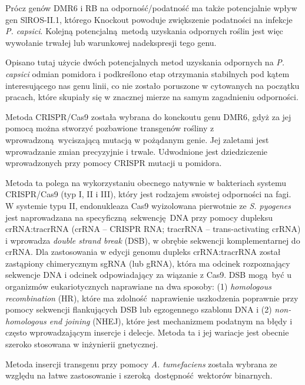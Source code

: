 \documentclass[two column, twoside, a4paper]{article}
\begin{document}
Prócz genów DMR6 i RB na odporność/podatność ma także potencjalnie wpływ gen SlROS-II.1, którego Knockout powoduje zwiększenie podatności na infekcje \textit{P. capsici}\autocite{Yang2020}. Kolejną potencjalną metodą uzyskania odpornych roślin jest więc wywołanie trwałej lub warunkowej nadekspresji tego genu.

Opisano tutaj użycie dwóch potencjalnych metod uzyskania odpornych na \textit{P. capsici} odmian pomidora i podkreślono etap otrzymania stabilnych pod kątem interesującego nas genu linii, co nie zostało poruszone w cytowanych na początku pracach, które skupiały się w znacznej mierze na samym zagadnieniu odporności.

Metoda CRISPR/Cas9 została wybrana do konckoutu genu DMR6, gdyż za jej pomocą można stworzyć pozbawione transgenów rośliny z wprowadzoną wyciszającą mutacją w pożądanym genie. Jej zaletami jest wprowadzanie zmian precyzyjnie i trwale. Udwodnione jest dziedziczenie wprowadzonych przy pomocy CRISPR mutacji u pomidora\autocite{Pan2016}.

Metoda ta polega na wykorzystaniu obecnego natywnie w bakteriach systemu CRISPR/Cas9 (typ I, II i III), który jest rodzajem swoistej odporności na fagi\autocite{Mojica2000, Makarova2011}. W systemie typu II, endonukleaza Cas9 wyizolowana pierwotnie ze \textit{S. pyogenes} jest naprowadzana na specyficzną sekwencję DNA przy pomocy dupleksu crRNA:tracrRNA (crRNA -- CRISPR RNA; tracrRNA -- trans-activating crRNA) i wprowadza \textit{double strand break} (DSB), w obrębie sekwencji komplementarnej do crRNA\autocite{Gaj2013, Jiang2017}. Dla zastosowania w edycji genomu dupleks crRNA:tracrRNA został zastąpiony chimerycznym sgRNA (lub gRNA), która ma odcinek rozpoznający sekwencje DNA i odcinek odpowiadający za wiązanie z Cas9. DSB mogą być u organizmów eukariotycznych naprawiane na dwa sposoby: (1) \textit{homologous recombination} (HR), które ma zdolność naprawienie uszkodzenia poprawnie przy pomocy sekwencji flankujących DSB lub egzogennego szablonu DNA i (2) \textit{non-homologous end joining} (NHEJ), które jest mechanizmem podatnym na błędy i często wprowadzającym insercje i delecje\autocite{Gaj2013, Ray2002, Wyman2006}. Metoda ta i jej wariacje jest obecnie szeroko stosowana w inżynierii gnetycznej\autocite{Ran2013, Hsu2014, Doudna2014}.

Metoda insercji transgenu przy pomocy \textit{A. tumefaciens} została wybrana ze względu na łatwe zastosowanie i szeroką dostępność wektorów binarnych.

\printbibliography
\end{document}
